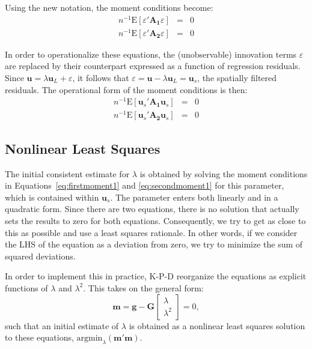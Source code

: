 \documentclass{article}
\begin{document}
Using the new notation, the moment conditions become:
\begin{eqnarray*}
n^{-1} \mbox{E} [ \varepsilon ' \mathbf{A_1} \varepsilon ] &=& 0\\
n^{-1} \mbox{E} [ \varepsilon ' \mathbf{A_2} \varepsilon ] &=& 0
\end{eqnarray*}

In order to operationalize these equations, the (unobservable) innovation terms
$\varepsilon$ are replaced by their counterpart expressed as a function of regression
residuals. Since $\mathbf{u} = \lambda \mathbf{u}_L + \varepsilon$, it follows that
$\varepsilon = \mathbf{u} - \lambda \mathbf{u}_L = \mathbf{u}_s$, the spatially
filtered residuals. The operational form of the moment conditions is
then:
\begin{eqnarray}
n^{-1} \mbox{E} [ \mathbf{u}_s ' \mathbf{A_1} \mathbf{u}_s ] &=& 0 \label{eq:firstmoment1}\\
n^{-1} \mbox{E} [ \mathbf{u}_s ' \mathbf{A_2} \mathbf{u}_s ] &=& 0 \label{eq:secondmoment1}
\end{eqnarray}

\subsection{Nonlinear Least Squares}\label{ss:nonlinearls}
The initial consistent estimate for $\lambda$ is obtained by solving the moment
conditions in Equations~\ref{eq:firstmoment1} and \ref{eq:secondmoment1} for this parameter, which is contained within $\mathbf{u}_s$. The parameter
enters both linearly and in a quadratic form. Since there are two equations,
there is no solution that actually sets the results to zero for both equations.
Consequently, we try to get as close to this as possible and use a least squares
rationale. In other words, if we consider the LHS of the equation as a deviation
from zero, we try to minimize the sum of squared deviations.

In order to implement this in practice, K-P-D reorganize the equations as 
explicit functions of $\lambda$ and $\lambda^2$. This takes on the general form:
\begin{equation}\label{eq:mgg}
\mathbf{m} = \mathbf{g} - \mathbf{G}
\left[
\begin{matrix}
\lambda\\
\lambda^2
\end{matrix}
\right] = 0,
\end{equation}
such that an initial estimate of $\lambda$ is obtained as a nonlinear least
squares solution to these equations, $\mbox{argmin}_\lambda (\mathbf{m'm})$.
\end{document}

